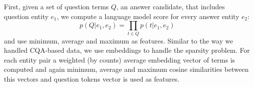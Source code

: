 First, given a set of question terms $Q$, an answer candidate, that includes question entity $e_1$, we compute a language model score for every answer entity $e_2$:
$$p(Q|e_1, e_2) = \prod_{t\in Q} p(t | e_1, e_2)$$
and use minimum, average and maximum as features.
Similar to the way we handled CQA-based data, we use embeddings to handle the sparsity problem.
For each entity pair a weighted (by counts) average embedding vector of terms is computed and again minimum, average and maximum cosine similarities between this vectors and question tokens vector is used as features.
